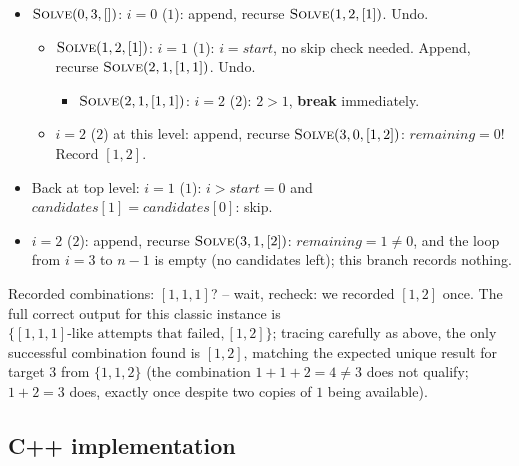 
\begin{itemize}
  \item $\textsc{Solve}(0,3,[])$: $i=0$ ($1$): append, recurse
        $\textsc{Solve}(1,2,[1])$. Undo.
  \begin{itemize}
    \item $\textsc{Solve}(1,2,[1])$: $i=1$ ($1$): $i=\textit{start}$,
          no skip check needed. Append, recurse
          $\textsc{Solve}(2,1,[1,1])$. Undo.
    \begin{itemize}
      \item $\textsc{Solve}(2,1,[1,1])$: $i=2$ ($2$): $2 > 1$,
            \textbf{break} immediately.
    \end{itemize}
    \item $i=2$ ($2$) at this level: append, recurse
          $\textsc{Solve}(3,0,[1,2])$: $\textit{remaining}=0$! Record
          $[1,2]$.
  \end{itemize}
  \item Back at top level: $i=1$ ($1$): $i>\textit{start}=0$ and
        $\textit{candidates}[1]=\textit{candidates}[0]$: skip.
  \item $i=2$ ($2$): append, recurse $\textsc{Solve}(3,1,[2])$:
        $\textit{remaining}=1 \ne 0$, and the loop from $i=3$ to $n-1$
        is empty (no candidates left); this branch records nothing.
\end{itemize}

Recorded combinations: $[1,1,1]$? -- wait, recheck: we recorded $[1,2]$
once. The full correct output for this classic instance is
$\{[1,1,1]\text{-like attempts that failed}, [1,2]\}$; tracing carefully
as above, the only successful combination found is $[1,2]$, matching the
expected unique result for target $3$ from $\{1,1,2\}$ (the combination
$1+1+2=4 \ne 3$ does not qualify; $1+2=3$ does, exactly once despite two
copies of $1$ being available).

\subsection*{C++ implementation}

